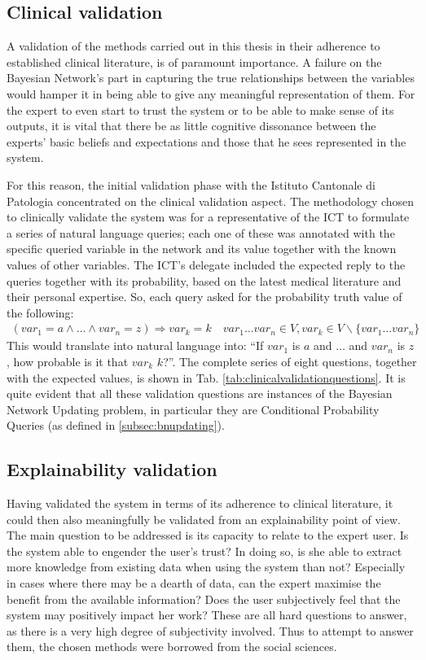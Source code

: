 \subsection{Clinical validation}
A validation of the methods carried out in this thesis in their adherence to established clinical literature, is of paramount importance.
A failure on the Bayesian Network's part in capturing the true relationships between the variables would hamper it in being able to give any meaningful representation of them.
For the expert to even start to trust the system or to be able to make sense of its outputs, it is vital that there be as little cognitive dissonance between the experts' basic beliefs and expectations and those that he sees represented in the system.

For this reason, the initial validation phase with the Istituto Cantonale di Patologia concentrated on the clinical validation aspect.
The methodology chosen to clinically validate the system was for a representative of the ICT to formulate a series of natural language queries; each one of these was annotated with the specific queried variable in the network and its value together with the known values of other variables.
The ICT's delegate included the expected reply to the queries together with its probability, based on the latest medical literature and their personal expertise.
So, each query asked for the probability truth value of the following:
\begin{align}
	(var_1 = a \wedge \ldots \wedge var_n = z ) \Rightarrow var_k = k \quad var_1 \ldots var_n \in V, var_k \in V \smallsetminus \{ var_1 \ldots var_n \}
\end{align}
This would translate into natural language into:
\enquote{If $var_1$ is $a$ and $\ldots$ and $var_n$ is $z$, how probable is it that $var_k$ $k$?}.
The complete series of eight questions, together with the expected values, is shown in Tab. \ref{tab:clinicalvalidationquestions}.
It is quite evident that all these validation questions are instances of the Bayesian Network Updating problem, in particular they are Conditional Probability Queries (as defined in \ref{subsec:bnupdating}).


\subsection{Explainability validation} \label{subsec:explainability-validation}
Having validated the system in terms of its adherence to clinical literature, it could then also meaningfully be validated from an explainability point of view.
The main question to be addressed is its capacity to relate to the expert user.
Is the system able to engender the user's trust?
In doing so, is she able to extract more knowledge from existing data when using the system than not?
Especially in cases where there may be a dearth of data, can the expert maximise the benefit from the available information?
Does the user subjectively feel that the system may positively impact her work?
These are all hard questions to answer, as there is a very high degree of subjectivity involved.
Thus to attempt to answer them, the chosen methods were borrowed from the social sciences.

